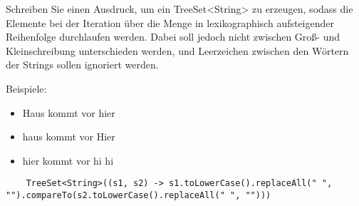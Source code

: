Schreiben Sie einen Ausdruck, um ein TreeSet<String> zu erzeugen, sodass die
Elemente bei der Iteration über die Menge in lexikographisch aufsteigender
Reihenfolge durchlaufen werden. Dabei soll jedoch nicht zwischen Groß- und
Kleinschreibung unterschieden werden, und Leerzeichen zwischen den Wörtern der
Strings sollen ignoriert werden.

Beispiele:

\begin{itemize}
    \item Haus kommt vor hier
    \item haus kommt vor Hier
    \item hier kommt vor hi hi
\end{itemize}

\begin{lstlisting}
    TreeSet<String>((s1, s2) -> s1.toLowerCase().replaceAll(" ", "").compareTo(s2.toLowerCase().replaceAll(" ", "")))
\end{lstlisting}